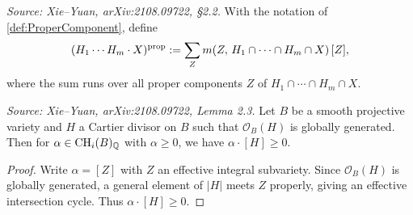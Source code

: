 \begin{definition}
  \label{def:ProperPartIntersection}
  \textit{Source: Xie--Yuan, arXiv:2108.09722, \S2.2.}
  With the notation of \cref{def:ProperComponent}, define
  \[
    (H_1 \cdots H_m \cdot X)^{\mathrm{prop}}
    := \sum_Z m(Z,\, H_1 \cap \cdots \cap H_m \cap X)\,[Z],
  \]
  where the sum runs over all proper components \(Z\) of \(H_1 \cap \cdots \cap H_m \cap X\).
\end{definition}

\begin{lemma}
  \label{lem:cutAmpleEff}
  \textit{Source: Xie--Yuan, arXiv:2108.09722, Lemma 2.3.}
  Let \(B\) be a smooth projective variety and \(H\) a Cartier divisor on \(B\) such that
  \(\mathcal{O}_B(H)\) is globally generated.
  Then for \(\alpha \in \operatorname{CH}_i(B)_{\mathbb{Q}}\) with \(\alpha \geq 0\),
  we have \(\alpha \cdot [H] \geq 0\).
\end{lemma}

\begin{proof}
  Write \(\alpha = [Z]\) with \(Z\) an effective integral subvariety.
  Since \(\mathcal{O}_B(H)\) is globally generated, a general element of \(|H|\) meets \(Z\)
  properly, giving an effective intersection cycle.  Thus \(\alpha \cdot [H] \geq 0\).
\end{proof}

